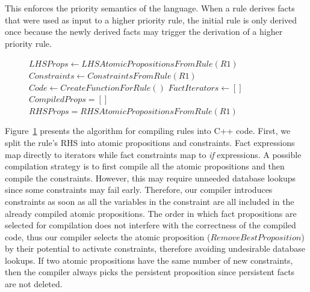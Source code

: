 This enforces the priority semantics of the language. When a rule derives facts
that were used as input to a higher priority rule, the initial rule is only
derived once because the newly derived facts may trigger the derivation of a
higher priority rule.
    
\begin{figure}
\begin{algorithm}[H]
 $LHSProps \longleftarrow LHSAtomicPropositionsFromRule(R1)$\;
 $Constraints \longleftarrow ConstraintsFromRule(R1)$\;
 $Code \longleftarrow CreateFunctionForRule()$\;
 $FactIterators \longleftarrow []$\;
 $CompiledProps = []$\;
 $RHSProps = RHSAtomicPropositionsFromRule(R1)$\;
\end{algorithm}
 \label{alg:compile_rule}
\end{figure}

Figure~\ref{alg:compile_rule} presents the algorithm for compiling rules into
C++ code. First, we split the rule's RHS into atomic propositions and
constraints. Fact expressions map directly to iterators while fact constraints
map to \emph{if} expressions. A possible compilation strategy is to first
compile all the atomic propositions and then compile the constraints. However,
this may require unneeded database lookups since some constraints may fail
early.  Therefore, our compiler introduces constraints as soon as all the
variables in the constraint are all included in the already compiled atomic
propositions. The order in which fact propositions are selected for compilation
does not interfere with the correctness of the compiled code, thus our compiler
selects the atomic proposition ($RemoveBestProposition$) by their potential to
activate constraints, therefore avoiding undesirable database lookups. If two
atomic propositions have the same number of new constraints, then the compiler
always picks the persistent proposition since persistent facts are not deleted.

